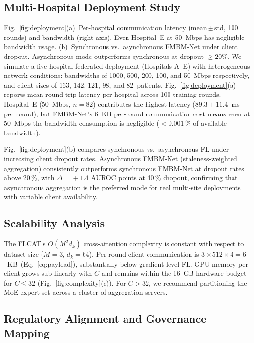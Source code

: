 \documentclass{ieeeaccess}
\begin{document}
\subsection{Multi-Hospital Deployment Study}
\label{subsec:deployment}
Fig.~\ref{fig:deployment}(a)~Per-hospital communication latency (mean\,$\pm$\,std, 100 rounds) and
bandwidth (right axis). Even Hospital~E at 50~Mbps has negligible bandwidth
usage. (b)~Synchronous vs.\ asynchronous FMBM-Net under client dropout.
Asynchronous mode outperforms synchronous at dropout $\geq 20\%$.
We simulate a five-hospital federated deployment (Hospitals A--E) with
heterogeneous network conditions: bandwidths of 1000, 500, 200, 100, and
50~Mbps respectively, and client sizes of 163, 142, 121, 98, and 82~patients.
Fig.~\ref{fig:deployment}(a) reports mean round-trip latency per hospital
across 100 training rounds. Hospital~E (50~Mbps, $n\!=\!82$) contributes the
highest latency ($89.3\!\pm\!11.4$~ms per round), but FMBM-Net's 6~KB
per-round communication cost means even at 50~Mbps the bandwidth consumption
is negligible ($< 0.001$\,\% of available bandwidth).

Fig.~\ref{fig:deployment}(b) compares synchronous vs.\ asynchronous FL under
increasing client dropout rates. Asynchronous FMBM-Net (staleness-weighted
aggregation) consistently outperforms synchronous FMBM-Net at dropout rates
above 20\,\%, with $\Delta\!=\!+1.4$ AUROC points at 40\,\% dropout,
confirming that asynchronous aggregation is the preferred mode for real multi-site deployments with variable client availability.





\subsection{Scalability Analysis}

The FLCAT's $O(M^2 d_k)$ cross-attention complexity is constant with respect
to dataset size ($M\!=\!3$, $d_k\!=\!64$). Per-round client communication is
$3\!\times\!512\!\times\!4\!=\!6$~KB~(Eq.~\ref{eq:payload}), substantially below
gradient-level FL. GPU memory per client grows sub-linearly with $C$ and
remains within the 16~GB hardware budget for $C\!\leq\!32$
(Fig.~\ref{fig:complexity}(c)). For $C\!>\!32$, we recommend partitioning the
MoE expert set across a cluster of aggregation servers.

\subsection{Regulatory Alignment and Governance Mapping}
\label{subsec:governance}
\end{document}
